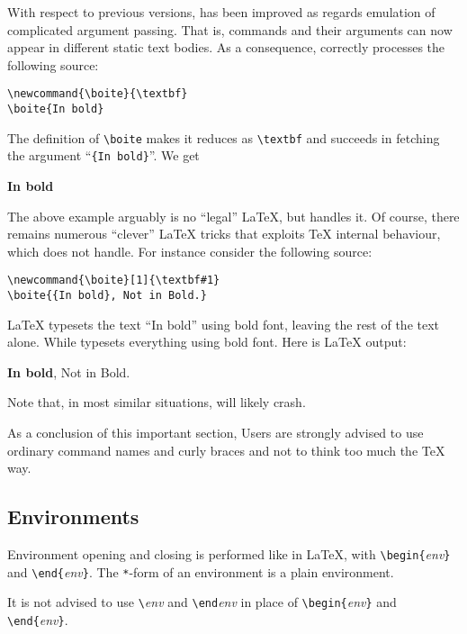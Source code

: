 With respect to previous versions,
\hevea{} has been improved as regards emulation of complicated
argument passing. That is,
commands and their arguments can now appear in
different static text bodies. As a consequence,
\hevea{} correctly processes the following source:
\begin{verbatim}
\newcommand{\boite}{\textbf}
\boite{In bold}
\end{verbatim}
The definition of \verb+\boite+ makes it reduces as
\verb+\textbf+ and \hevea{} succeeds in fetching the argument
``\verb+{In bold}+''. We get
\begin{htmlout}
\newcommand{\boite}{\textbf}
\boite{In bold}
\end{htmlout}

The above example arguably is no ``legal'' \LaTeX{},
but \hevea{} handles it.
Of course, there remains
numerous ``clever'' \LaTeX{} tricks that exploits \TeX{} internal
behaviour, which \hevea{} does not handle.
For instance consider the following source:
\begin{verbatim}
\newcommand{\boite}[1]{\textbf#1}
\boite{{In bold}, Not in Bold.}
\end{verbatim}
\LaTeX{} typesets the text ``In bold'' using bold font, leaving
the rest of the text alone. While \hevea{} typesets everything using
bold font. Here is \ifhevea\hevea\else\LaTeX\fi{} output:
\begin{htmlout}
\newcommand{\boite}[1]{\textbf#1}
\boite{{In bold}, Not in Bold.}
\end{htmlout}
Note that, in most similar situations, \hevea{} will likely crash.


As a conclusion of this important section,
Users are strongly advised to use ordinary command names and
curly braces and not to think too much the \TeX{} way.




\subsection{Environments}

Environment opening and closing is performed like in \LaTeX{}, with
\verb+\begin{+\textit{env}\verb+}+ and
\verb+\end{+\textit{env}\verb+}+.
The \verb+*+-form of an environment is a plain environment.

It is not advised to use \verb+\+\textit{env} and
\verb+\end+\textit{env} in place of \verb+\begin{+\textit{env}\verb+}+ and
\verb+\end{+\textit{env}\verb+}+.

